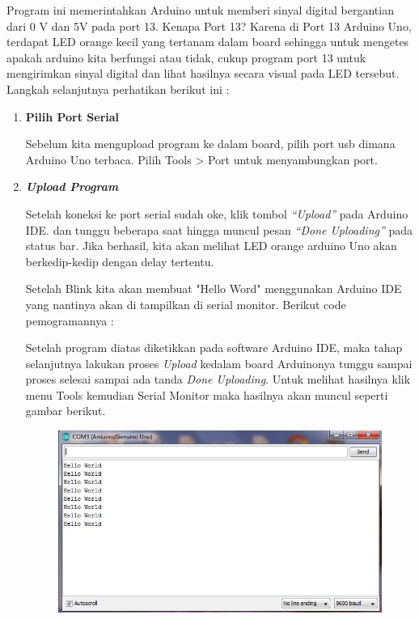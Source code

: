 \par Program ini memerintahkan Arduino untuk memberi sinyal digital bergantian dari  0 V dan 5V pada port 13. Kenapa Port 13? Karena di Port 13 Arduino Uno, terdapat  LED orange kecil yang tertanam dalam board sehingga untuk mengetes apakah arduino kita berfungsi atau tidak, cukup program port 13 untuk mengirimkan sinyal digital dan lihat hasilnya secara visual pada LED tersebut. Langkah selanjutnya perhatikan berikut ini :
\begin{enumerate}
    \item \textbf{Pilih Port Serial} 
    \par Sebelum kita mengupload program ke dalam board, pilih port usb dimana Arduino Uno terbaca. Pilih Tools > Port  untuk menyambungkan port.
    \item \textbf{\textit{Upload Program}}
    \par Setelah koneksi ke port serial sudah oke, klik tombol \textit{“Upload”} pada Arduino IDE. dan tunggu beberapa saat hingga muncul pesan \textit{“Done Uploading”} pada status bar. Jika berhasil, kita akan melihat LED orange arduino Uno akan berkedip-kedip dengan delay tertentu.
\par Setelah Blink kita akan membuat "Hello Word" menggunakan Arduino IDE yang nantinya akan di tampilkan di serial monitor. Berikut code pemogramannya :

\par Setelah program diatas diketikkan pada software Arduino IDE, maka tahap selanjutnya lakukan proses \textit{Upload} kedalam board Arduinonya tunggu sampai proses selesai sampai ada tanda \textit{Done Uploading}. Untuk melihat hasilnya klik menu Tools kemudian Serial Monitor maka hasilnya akan muncul seperti gambar berikut.
\begin{figure}[H]
\centering
\includegraphics[width=1\textwidth]{figures/hello.jpg}

\end{figure}
\end{enumerate}
